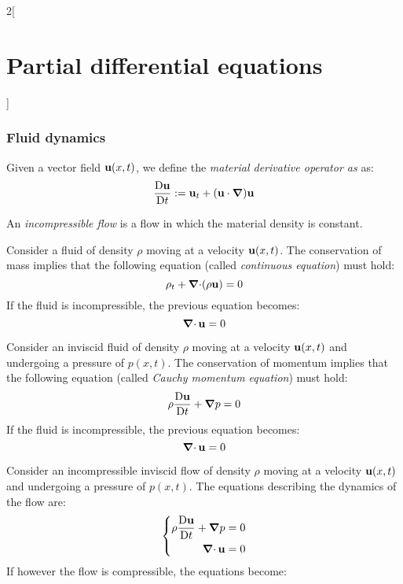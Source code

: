 \documentclass[../../../main_math.tex]{subfiles}
\begin{document}
\begin{multicols}{2}[\section{Partial differential equations}]
  \subsubsection{Fluid dynamics}
  \begin{definition}
    Given a vector field $\boldsymbol{\mathrm{u}}(x,t)$, we define the \emph{material derivative operator as} as: $$\frac{\mathrm{D}\boldsymbol{\mathrm{u}}}{\mathrm{D}t}:=\boldsymbol{\mathrm{u}}_t+(\boldsymbol{\mathrm{u}}\cdot\grad)\boldsymbol{\mathrm{u}}$$
  \end{definition}
  \begin{definition}
    An \emph{incompressible flow} is a flow in which the material density is constant.
  \end{definition}
  \begin{proposition}
    Consider a fluid of density $\rho$ moving at a velocity $\boldsymbol{\mathrm{u}}(x,t)$. The conservation of mass implies that the following equation (called \emph{continuous equation}) must hold:
    \begin{equation}\label{PDE_continuous}
      \rho_t+\operatorname{\boldsymbol{\mathrm{\nabla}}\cdot}(\rho\boldsymbol{\mathrm{u}})=0
    \end{equation}
    If the fluid is incompressible, the previous equation becomes: $$\operatorname{\boldsymbol{\mathrm{\nabla}}\cdot}{\boldsymbol{\mathrm{u}}}=0$$
  \end{proposition}
  \begin{proposition}
    Consider an inviscid fluid of density $\rho$ moving at a velocity $\boldsymbol{\mathrm{u}}(x,t)$ and undergoing a pressure of $p(x,t)$. The conservation of momentum implies that the following equation (called \emph{Cauchy momentum equation}) must hold:
    \begin{equation}\label{PDE_cauchy}
      \rho\frac{\mathrm{D}\boldsymbol{\mathrm{u}}}{\mathrm{D}t}+\grad p=0
    \end{equation}
    If the fluid is incompressible, the previous equation becomes: $$\operatorname{\boldsymbol{\mathrm{\nabla}}\cdot}{\boldsymbol{\mathrm{u}}}=0$$
  \end{proposition}
  \begin{theorem}
    Consider an incompressible inviscid flow of density $\rho$ moving at a velocity $\boldsymbol{\mathrm{u}}(x,t)$ and undergoing a pressure of $p(x,t)$. The equations describing the dynamics of the flow are:
    \begin{equation*}
      \left\{
      \begin{aligned}
        \rho\frac{\mathrm{D}\boldsymbol{\mathrm{u}}}{\mathrm{D}t}+\grad p & =0 \\
        \operatorname{\boldsymbol{\mathrm{\nabla}}\cdot}{\boldsymbol{\mathrm{u}}}                 & =0
      \end{aligned}
      \right.
    \end{equation*}
    If however the flow is compressible, the equations become:

\end{theorem}
\end{multicols}
\end{document}
